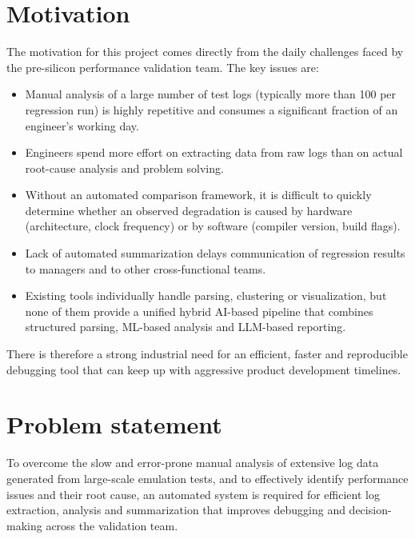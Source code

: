 \section[Motivation]{\textbf{Motivation}}

The motivation for this project comes directly from the daily challenges faced by the pre-silicon performance validation team. The key issues are:

\begin{itemize}
\item Manual analysis of a large number of test logs (typically more than 100 per regression run) is highly repetitive and consumes a significant fraction of an engineer's working day.
\item Engineers spend more effort on extracting data from raw logs than on actual root-cause analysis and problem solving.
\item Without an automated comparison framework, it is difficult to quickly determine whether an observed degradation is caused by hardware (architecture, clock frequency) or by software (compiler version, build flags).
\item Lack of automated summarization delays communication of regression results to managers and to other cross-functional teams.
\item Existing tools individually handle parsing, clustering or visualization, but none of them provide a unified hybrid AI-based pipeline that combines structured parsing, ML-based analysis and LLM-based reporting.
\end{itemize}

There is therefore a strong industrial need for an efficient, faster and reproducible debugging tool that can keep up with aggressive product development timelines.

\section[Problem statement]{\textbf{Problem statement}}

To overcome the slow and error-prone manual analysis of extensive log data generated from large-scale emulation tests, and to effectively identify performance issues and their root cause, an automated system is required for efficient log extraction, analysis and summarization that improves debugging and decision-making across the validation team.


